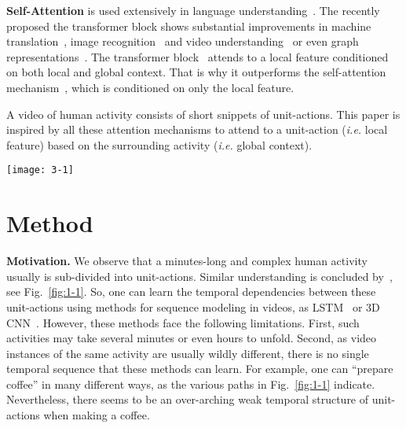 \documentclass[10pt,twocolumn,letterpaper]{article}
\def\ie{\emph{i.e.}\xspace}
\newcommand{\partitle}[1]{\noindent\textbf{#1}}
\newcommand{\ptspace}{\vspace*{5pt}}
\begin{document}
\ptspace
\partitle{Self-Attention}
is used extensively in language understanding~\cite{lin2017structured}.
The recently proposed the transformer block shows substantial improvements in machine translation~\cite{vaswani2017attention}, image recognition~\cite{wang2017non} and video understanding~\cite{girdhar2018video, wu2018long} or even graph representations~\cite{velivckovic2017graph}.
The transformer block~\cite{wu2018long} attends to a local feature conditioned on both local and global context.
That is why it outperforms the self-attention mechanism~\cite{li2018videolstm, du2018interaction, yang2018action}, which is conditioned on only the local feature.

A video of human activity consists of short snippets of unit-actions.
This paper is inspired by all these attention mechanisms to attend to a unit-action (\ie local feature) based on the surrounding activity (\ie global context).

\begin{figure*}[!ht]
\begin{center}
\texttt{[image: 3-1]}
\end{center}
\caption{
Overview of VideoGraph.
It takes as input a video segment  of 8 frames from an activity video . Then, it represents it using standard 3D CNN, \textit{.e.g} I3D.
The corresponding feature representation is .
Then, a node attention block attends to a set of  latent concepts based on their similarities with , which results in the node-attenative representation .
A novel graph embedding layer then processes  to learn the relationships between its latent concepts, and arrives at the final video-level representation.
Finally, an MLP is used for classification.}
\label{fig:3-1}
\vspace*{-5mm}
\end{figure*}

\section{Method}\label{sec:method}
\partitle{Motivation.}
We observe that a minutes-long and complex human activity usually is sub-divided into unit-actions. Similar understanding is concluded by~\cite{kuehne2014language, hussein2018timeception}, see Fig.~\ref{fig:1-1}.
So, one can learn the temporal dependencies between these unit-actions using methods for sequence modeling in videos, as LSTM~\cite{li2017concurrent} or 3D CNN~\cite{xie2017rethinking}.
However, these methods face the following limitations.
First, such activities may take several minutes or even hours to unfold.
Second, as video instances of the same activity are usually wildly different, there is no single temporal sequence that these methods can learn.
For example, one can ``prepare coffee'' in many different ways, as the various paths in Fig.~\ref{fig:1-1} indicate.
Nevertheless, there seems to be an over-arching weak temporal structure of unit-actions when making a coffee.
\end{document}
